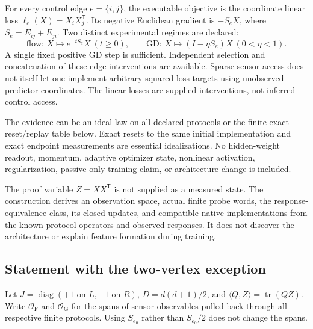 \documentclass[11pt]{article}
\theoremstyle{remark}
\newcommand{\tr}{\operatorname{tr}}
\newcommand{\diag}{\operatorname{diag}}
\newcommand{\OO}{\mathcal O}
\begin{document}
For every control edge $e=\{i,j\}$, the executable objective is the coordinate linear loss $\ell_e(X)=X_iX_j^{\mathsf T}$. Its negative Euclidean gradient is $-S_eX$, where $S_e=E_{ij}+E_{ji}$. Two distinct experimental regimes are declared:
\[
 \text{flow: }X\mapsto e^{-tS_e}X\ (t\geq0),\qquad
 \text{GD: }X\mapsto(I-\eta S_e)X\ (0<\eta<1).
\]
A single fixed positive GD step is sufficient. Independent selection and concatenation of these edge interventions are available. Sparse sensor access does not itself let one implement arbitrary squared-loss targets using unobserved predictor coordinates. The linear losses are supplied interventions, not inferred control access.

The evidence can be an ideal law on all declared protocols or the finite exact reset/replay table below. Exact resets to the same initial implementation and exact endpoint measurements are essential idealizations. No hidden-weight readout, momentum, adaptive optimizer state, nonlinear activation, regularization, passive-only training claim, or architecture change is included.

The proof variable $Z=XX^{\mathsf T}$ is not supplied as a measured state. The construction derives an observation space, actual finite probe words, the response-equivalence class, its closed updates, and compatible native implementations from the known protocol operators and observed responses. It does not discover the architecture or explain feature formation during training.

\subsection{Statement with the two-vertex exception}

Let $J=\diag(+1\text{ on }L,-1\text{ on }R)$, $D=d(d+1)/2$, and $\langle Q,Z\rangle=\tr(QZ)$. Write $\OO_{\mathrm F}$ and $\OO_{\mathrm G}$ for the spans of sensor observables pulled back through all respective finite protocols. Using $S_{e_0}$ rather than $S_{e_0}/2$ does not change the spans.
\end{document}
